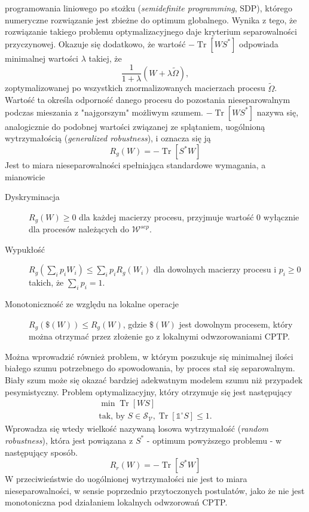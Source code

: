 \documentclass[10pt]{article} %
\DeclareMathOperator{\Trs}{Tr}
\newcommand{\IO}{\mathbb{1}^\circ}
\begin{document}
programowania liniowego po stożku (\textit{semidefinite programming}, SDP), którego numeryczne rozwiązanie jest zbieżne do optimum globalnego.
Wynika z tego, że rozwiązanie takiego problemu optymalizacyjnego daje kryterium separowalności przyczynowej.
Okazuje się dodatkowo, że wartość $-\Trs \left[ W S^* \right]$ odpowiada minimalnej wartości $\lambda$ takiej, że 
\begin{equation}
\frac{1}{1 + \lambda}\left( W + \lambda\widetilde{\Omega}\right),
\end{equation}
zoptymalizowanej po wszystkich znormalizowanych macierzach procesu $\widetilde{\Omega}$. Wartość ta określa odporność danego procesu do pozostania nieseparowalnym podczas mieszania z "najgorszym" możliwym szumem. $-\Trs \left [ W S^* \right]$ nazywa się, analogicznie do podobnej wartości związanej ze splątaniem, uogólnioną wytrzymałością (\textit{generalized robustness}), i oznacza się ją
\begin{equation}
R_g(W) = -\Trs \left[ S^* W \right]
\end{equation} Jest to miara nieseparowalności spełniająca standardowe wymagania, a mianowicie
\begin{description}
\item[Dyskryminacja] $R_g(W) \geq 0$ dla każdej macierzy procesu, przyjmuje wartość 0 wyłącznie dla procesów należących do $\mathcal{W}^{sep}$. 
\item[Wypukłość] $R_g(\sum_i p_i W_i) \leq \sum_i p_i R_g(W_i)$ dla dowolnych macierzy procesu i $p_i \geq 0$ takich, że $\sum_i p_i = 1$. 
\item[Monotoniczność ze względu na lokalne operacje] $R_g\left(\$(W)\right) \leq R_g\left(W\right)$, gdzie $\$(W)$ jest dowolnym procesem, który można 
otrzymać przez złożenie go z lokalnymi odwzorowaniami CPTP.
\end{description}
Można wprowadzić również problem, w którym poszukuje się minimalnej ilości białego szumu potrzebnego do spowodowania, by proces stał się separowalnym. Biały szum może się okazać bardziej adekwatnym modelem szumu niż przypadek pesymistyczny.
Problem optymalizacyjny, który otrzymuje się jest następujący
\begin{gather}
\min \Trs \left[ WS \right]\\
\text{tak, by } S \in \mathcal{S_V}, \Trs\left[\IO S\right] \leq 1.
\end{gather}
Wprowadza się wtedy wielkość nazywaną losowa wytrzymałość (\textit{random robustness}), która jest powiązana z $S^*$ - optimum powyższego problemu - w następujący sposób.
\begin{equation}
R_r(W) = -\Trs\left[S^* W\right]
\end{equation}
W przeciwieństwie do uogólnionej wytrzymałości nie jest to miara nieseparowalności, w sensie poprzednio przytoczonych postulatów, jako że nie jest monotoniczna pod działaniem lokalnych odwzorowań CPTP.
\end{document}
